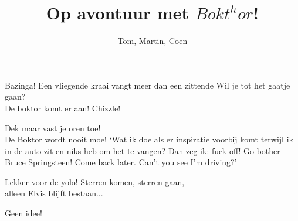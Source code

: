 \documentclass[openany]{article}
\title{Op avontuur met $Bokt^{h}or$!}
\author{Tom, Martin, Coen}
\begin{document}
\maketitle

\tableofcontents
{}



\begin{songs}{} %



\renewcommand{\lyricfont}{\sffamily\large}



\setcounter{songnum}{42}

	

			Bazinga!
		\endscripture
		\beginscripture{}
			Een vliegende kraai vangt meer dan een zittende
		\endscripture
			Wil je tot het gaatje gaan?	\\
			De boktor komt er aan!
		\endscripture
			Chizzle!
		\endscripture
	
	
	
			Dek maar vast je oren toe!	\\
			De Boktor wordt nooit moe!
		\endscripture
			`Wat ik doe als er inspiratie voorbij komt terwijl ik in de auto 
			zit en niks heb om het te vangen?
			Dan zeg ik: fuck off! Go bother Bruce Springsteen! 
			Come back later. Can't you see I'm driving?'
		\endscripture
	



			Lekker voor de yolo!
		\endscripture
			Sterren komen, sterren gaan, \\
			alleen Elvis blijft bestaan... 
		\endscripture
	
			Geen idee!
		\endscripture    
	

\end{songs}
\end{document}
